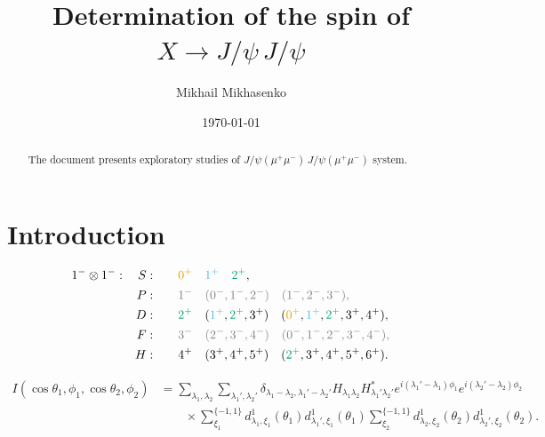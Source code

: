 \documentclass[prd,preprintnumbers,floatfix,
nofootinbib,superscriptaddress]{revtex4}
\begin{document}
\title{Determination of the spin of $X\to J/\psi\,J/\psi$}

\author{Mikhail Mikhasenko}

\date{\today}

\begin{abstract}
The document presents exploratory studies of $J/\psi (\mu^+\mu^-)\,J/\psi (\mu^+\mu^-)$ system.
\end{abstract}

\nopagebreak
\maketitle


\section{Introduction}

\begin{align*}
  1^-\otimes 1^-: && S:\qquad & {\color{cola} 0^+}\quad {\color{colb} 1^+}\quad {\color{colc} 2^+},\\
                  && P:\qquad & \color{gray} 1^-\quad (0^-,1^-,2^-)\quad (1^-,2^-,3^-),\\
                  && D:\qquad & {\color{colc} 2^+}\quad ({\color{colb} 1^+},{\color{colc} 2^+},3^+)\quad ({\color{cola} 0^+},{\color{colb} 1^+},{\color{colc} 2^+},3^+,4^+),\\
                  && F:\qquad & \color{gray} 3^-\quad (2^-,3^-,4^-)\quad (0^-,1^-,2^-,3^-,4^-),\\
                  && H:\qquad & 4^+\quad (3^+,4^+,5^+)\quad ({\color{colc} 2^+},3^+,4^+,5^+,6^+).
\end{align*}

\begin{align}
    I(\cos\theta_1,\phi_1,\cos\theta_2,\phi_2) &=
    \sum_{\lambda_1,\lambda_2}\sum_{\lambda_1',\lambda_2'}
    \delta_{\lambda_1-\lambda_2,\lambda_1'-\lambda_2'}
    H_{\lambda_1\lambda_2} H_{\lambda_1'\lambda_2'}^{*}
    e^{i(\lambda_1'-\lambda_1)\phi_1}
    e^{i(\lambda_2'-\lambda_2)\phi_2}
    \\ \nonumber
    &\qquad\times
    \sum_{\xi_1}^{\{-1,1\}}
    d_{\lambda_1,\xi_1}^{1}(\theta_1) d_{\lambda_1',\xi_1}^{1}(\theta_1)
    \sum_{\xi_2}^{\{-1,1\}}
    d_{\lambda_2,\xi_2}^{1}(\theta_2) d_{\lambda_2',\xi_2}^{1}(\theta_2).
\end{align}
\end{document}
